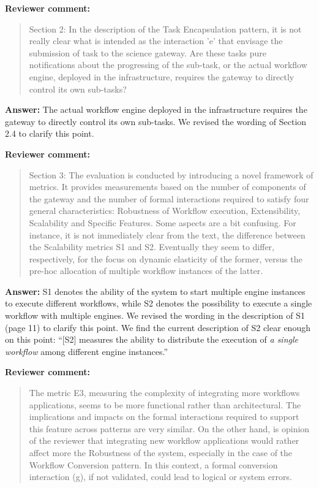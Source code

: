 \documentclass[a4]{article}
\newenvironment{review}%
{\textbf{Reviewer comment:}\begin{quote}}%
{\end{quote}}%
\newcommand{\answer}[1]{\textbf{Answer:} #1}
\begin{document}
\begin{review}
  Section 2: In the description of the Task Encapsulation pattern, it
  is not really clear what is intended as the interaction 'e' that
  envisage the submission of task to the science gateway. Are these
  tasks pure notifications about the progressing of the sub-task, or
  the actual workflow engine, deployed in the infrastructure, requires
  the gateway to directly control its own sub-tasks?
\end{review}

\answer{The actual workflow engine deployed in the infrastructure
  requires the gateway to directly control its own sub-tasks. We
  revised the wording of Section 2.4 to clarify this point.}

\begin{review}
  Section 3: The evaluation is conducted by introducing a novel
  framework of metrics. It provides measurements based on the number
  of components of the gateway and the number of formal interactions
  required to satisfy four general characteristics: Robustness of
  Workflow execution, Extensibility, Scalability and Specific
  Features. Some aspects are a bit confusing. For instance, it is not
  immediately clear from the text, the difference between the
  Scalability metrics S1 and S2. Eventually they seem to differ,
  respectively, for the focus on dynamic elasticity of the former,
  versus the pre-hoc allocation of multiple workflow instances of the
  latter.
\end{review}

\answer{S1 denotes the ability of the system to start multiple engine
  instances to execute different workflows, while S2 denotes the
  possibility to execute a single workflow with multiple engines. We
  revised the wording in the description of S1 (page 11) to clarify
  this point. We find the current description of S2 clear enough on
  this point: ``[S2] measures the ability to distribute the execution of
  \emph{a single workflow} among different engine instances.''}

\begin{review}
The metric E3, measuring the complexity of integrating more workflows applications, seems to be more functional rather than architectural. The implications and impacts on the formal interactions required to support this feature across patterns are very similar.
 On the other hand, is opinion of the reviewer that integrating new workflow applications would rather affect more the Robustness of the system, especially in the case of the Workflow Conversion pattern. In this context, a formal conversion interaction (g), if not validated, could lead to logical or system errors.
\end{review}
\end{document}
